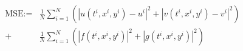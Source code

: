 \documentclass[book.tex]{subfiles}
\begin{document}
\begin{align}
\begin{split}
    \textrm{MSE} :=& \frac{1}{N}\sum_{i=1}^{N} \left(|u(t^i,x^i,y^i) - u^i|^2 + |v(t^i,x^i,y^i) - v^i|^2\right) \\
    +& \frac{1}{N}\sum_{i=1}^{N} \left(|f(t^i,x^i,y^i)|^2 + |g(t^i,x^i,y^i)|^2\right)
    \end{split}
\end{align}



\end{document}
